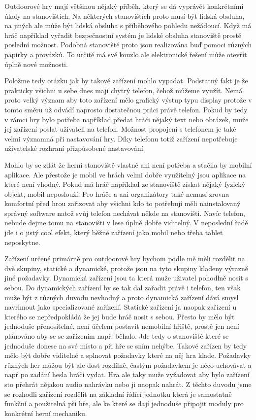 Outdoorové hry mají většinou nějaký příběh, který se dá vyprávět konkrétními úkoly na stanovištích.
Na některých stanovištích proto musí být lidská obsluha, na jiných ale může být lidská obsluha s příběhového pohledu nežádoucí.
Když má hráč například vyřadit bezpečnostní systém je lidské obsluha stanoviště prostě poslední možnost.
Podobná stanoviště proto jsou realizována buď pomoci různých papírky a provázků.
To určitě má své kouzlo ale elektronické řešení může otevřít úplně nové možnosti.

Položme tedy otázku jak by takové zařízení mohlo vypadat.
Podstatný fakt je že prakticky všichni u sebe dnes mají chytrý telefon, čehož můžeme využít.
Nemá proto velký význam aby toto zařízení mělo grafický výstup typu display protože v tomto směru už odvádí naprosto dostatečnou práci právě telefon.
Pokud by tedy v rámci hry bylo potřeba například předat hráči nějaký text nebo obrázek, muže jej zařízení poslat uživateli na telefon.
Možnost propojení s telefonem je také velmi významná při nastavování hry.
Díky telefonu totiž zařízení nepotřebuje uživatelské rozhraní přizpůsobené nastavování.

Mohlo by se zdát že herní stanoviště vlastně ani není potřeba a stačila by mobilní aplikace.
Ale přestože je mobil ve hrách velmi dobře využitelný jsou aplikace na které není vhodný.
Pokud má hráč například ze stanoviště získat nějaký fyzický objekt, mobil neposlouží.
Pro hráče a ani organizátory také nemusí zrovna komfortní před hrou zařizovat aby všichni kdo to potřebují měli nainstalovaný správný software natož svůj telefon nechávat někde na stanovišti.
Navíc telefon, nebude dejme tomu na stanovišti v lese úplně dobře viditelný.
V neposlední řadě jde i o jistý cool efekt, který běžné zařízení jako mobil nebo třeba tablet neposkytne.

Zařízení určené primárně pro outdoorové hry bychom podle mě měli rozdělit na dvě skupiny, statické a dynamické, protože jsou na tyto skupiny kladeny výrazně jiné požadavky.
Dynamická zařízení jsou ta která muže uživatel pohodlně nosit s sebou.
Do dynamických zařízení by se tak dal zařadit právě i telefon, ten však muže být z různých duvodu nevhodný a proto dynamická zařízení dává smysl navrhnout jako specializované zařízení.
Statické zařízení ja naopak zařízení u kterého se nepředpokládá že jej bude hráč nosit s sebou.
Přesto by mělo být jednoduše přenositelné, není účelem postavit nemobilní hřiště, prostě jen není plánováno aby se se zařízením např. běhalo.
Jde tedy o stanoviště které se jednoduše donese na své místo a při hře se sním nehýbe.
Takové zařízen by tedy mělo být dobře viditelné a splnovat požadavky které na něj hra klade.
Požadavky různých her můžou být ale dost rozdílně, častým požadavkem je něco uchovávat a např po zadání hesla hráči vydat.
Hra ale taky muže vyžadovat aby bylo zařízení sto přehrát nějakou audio nahrávku nebo ji naopak nahrát.
Z těchto duvodu jsme se rozhodli zařízení rozdělit na základní řídící jednotku která je samostatně funkční a použitelná při hře, ale ke které se dají jednoduše připojit moduly pro konkrétní herní mechaniku.


